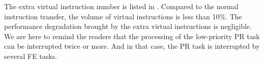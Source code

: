 The extra virtual instruction number is listed in . Compared to the normal instruction transfer, the volume of virtual instructions is less than 10\%. The performance degradation brought by the extra virtual instructions is negligible. 
We are here to remind the readers that the processing of the low-priority PR task can be interrupted twice or more. And in that case, the PR task is interrupted by several FE tasks.





  
  



